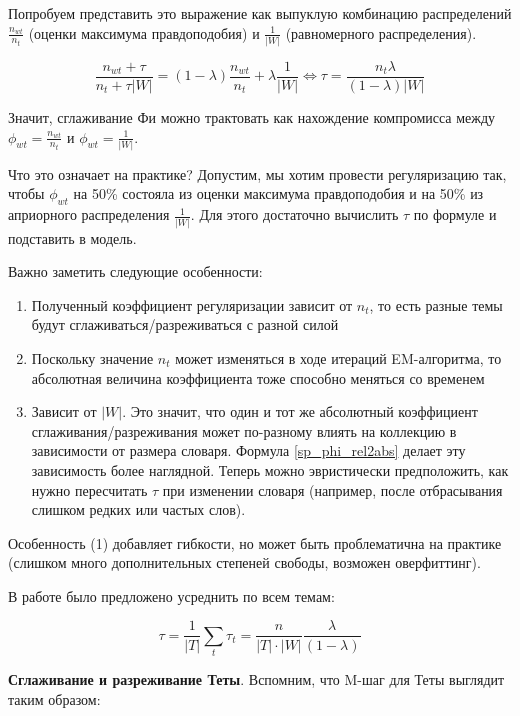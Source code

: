 Попробуем представить это выражение как выпуклую комбинацию распределений  $\frac{n_{wt}}{n_t}$ (оценки максимума правдоподобия) и $\frac{1}{|W|}$ (равномерного распределения).  

\[ 

\frac{n_{wt} + \tau}{n_{t} + \tau |W|} = (1-\lambda) \frac{n_{wt}}{n_t} + \lambda \frac{1}{|W|} \iff \tau  = \frac{n_t \lambda}{(1-\lambda) |W|} \label{sp_phi_rel2abs}  

\] 

Значит, сглаживание Фи можно трактовать как нахождение компромисса между $\phi_{wt} = \frac{n_{wt}}{n_t}$ и $\phi_{wt} = \frac{1}{|W|}$.  

Что это означает на практике? Допустим, мы хотим провести регуляризацию так, чтобы $\phi_{wt}$ на 50\% состояла из оценки максимума правдоподобия и на 50\% из априорного распределения $\frac{1}{|W|}$. Для этого достаточно вычислить $\tau$ по формуле и подставить в модель.  

Важно заметить следующие особенности:  

\begin{enumerate} 
    \item  {Полученный коэффициент регуляризации зависит от $n_t$, то есть разные темы будут сглаживаться/разреживаться с разной силой} 
    \item  {Поскольку значение $n_t$ может изменяться в ходе итераций EM-алгоритма, то абсолютная величина коэффициента тоже способно меняться со временем} 
    \item  {Зависит от $|W|$. Это значит, что один и тот же абсолютный коэффициент сглаживания/разреживания может по-разному влиять на коллекцию в зависимости от размера словаря.  Формула \ref{sp_phi_rel2abs} делает эту зависимость более наглядной. Теперь можно эвристически предположить, как нужно пересчитать $\tau$ при изменении словаря (например, после отбрасывания слишком редких или частых слов).} 
\end{enumerate} 

Особенность (1) добавляет гибкости, но может быть проблематична на практике (слишком много дополнительных степеней свободы, возможен оверфиттинг).  

В работе \cite{doykov} было предложено усреднить по всем темам: 

\[ 

\tau = \frac{1}{|T|} \sum_t \tau_t = \frac{n}{|T|\cdot|W|} \frac{\lambda}{(1-\lambda)} 

\] 

\textbf{Сглаживание и разреживание Теты}. Вспомним, что M-шаг для Теты выглядит таким образом: 


